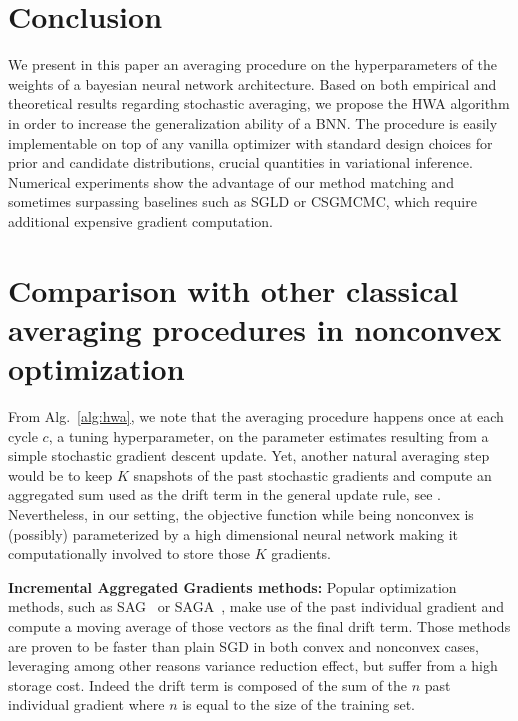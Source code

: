 \documentclass[tablecaption=bottom,wcp]{jmlr}
\makeatletter
\let\oldappendix\appendix
\renewcommand{\appendix}{%
  \addtocontents{toc}{\let\protect\numberline\protect\appendixnumberline}%
  \renewcommand{\@seccntformat}[1]{~\csname the##1\endcsname\quad}%
  \oldappendix
}
\makeatother
\begin{document}
\section{Conclusion}\label{sec:conclusion}
We present in this paper an averaging procedure on the hyperparameters of the weights of a bayesian neural network architecture.
Based on both empirical and theoretical results regarding stochastic averaging, we propose the \textsc{HWA} algorithm in order to increase the generalization ability of a BNN.
The procedure is easily implementable on top of any vanilla optimizer with standard design choices for prior and candidate distributions, crucial quantities in variational inference.
Numerical experiments show the advantage of our method matching and sometimes surpassing baselines such as SGLD or CSGMCMC, which require additional expensive gradient computation.


\clearpage



\clearpage
\appendix

  \hsize\textwidth
  \linewidth{}

 
\section{Comparison with other classical averaging procedures in nonconvex optimization}
From Alg.~\ref{alg:hwa}, we note that the averaging procedure happens once at each cycle $c$, a tuning hyperparameter, on the parameter estimates resulting from a simple stochastic gradient descent update.
Yet, another natural averaging step would be to keep $K$ snapshots of the past stochastic gradients and compute an aggregated sum used as the drift term in the general update rule, see \citep{zhou2017convergence}.
Nevertheless, in our setting, the objective function while being nonconvex is (possibly) parameterized by a high dimensional neural network making it computationally involved to store those $K$ gradients.


\textbf{Incremental Aggregated Gradients methods:} Popular optimization methods, such as SAG~\citep{schmidt2017minimizing} or SAGA~\citep{defazio2014saga}, make use of the past individual gradient and compute a moving average of those vectors as the final drift term. Those methods are proven to be faster than plain SGD in both convex and nonconvex cases, leveraging among other reasons variance reduction effect, but suffer from a high storage cost. Indeed the drift term is composed of the sum of the $n$ past individual gradient where $n$ is equal to the size of the training set.
\end{document}
